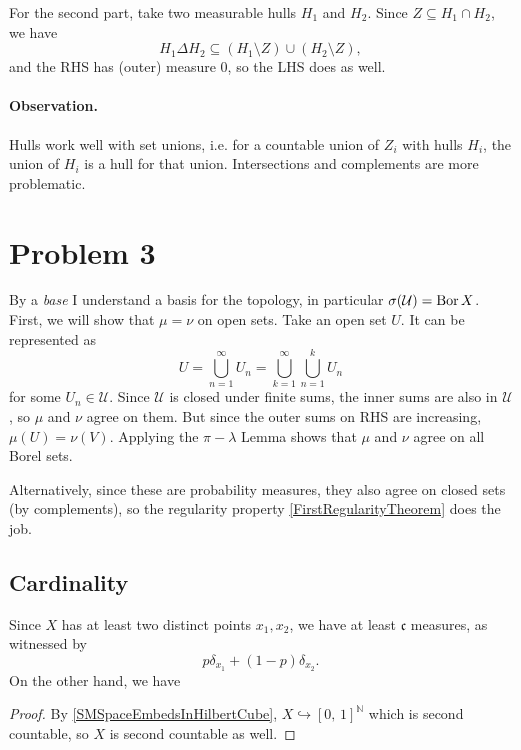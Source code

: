 For the second part, take two measurable hulls \( H_1 \) and \( H_2 \). Since \( Z \subseteq H_1 \cap H_2 \), we have
\[ 
    H_1 \Delta H_2 \subseteq (H_1 \setminus Z) \cup (H_2 \setminus Z),
\]
and the RHS has (outer) measure \( 0 \), so the LHS does as well.

\paragraph{Observation.} Hulls work well with set unions, i.e. for a countable union of \( Z_i \) with hulls \( H_i \), the union of \( H_i \) is a hull for that union. Intersections and complements are more problematic.

\section*{Problem 3}

By a \emph{base} I understand a basis for the topology, in particular \( \sigma( \mathcal{U} ) = \operatorname{Bor} X \). First, we will show that \( \mu = \nu \) on open sets. Take an open set \( U \). It can be represented as
\[ 
    U = \bigcup_{n=1}^\infty U_n = \bigcup_{k=1}^\infty \bigcup_{n=1}^k U_n
\]
for some \( U_n \in \mathcal{U} \). Since \( \mathcal{U} \) is closed under finite sums, the inner sums are also in \( \mathcal{U} \), so \( \mu \) and \( \nu \) agree on them. But since the outer sums on RHS are increasing, \( \mu(U) = \nu(V) \). Applying the \( \pi-\lambda \) Lemma shows that \( \mu \) and \( \nu \) agree on all Borel sets.

Alternatively, since these are probability measures, they also agree on closed sets (by complements), so the regularity property \ref{FirstRegularityTheorem} does the job.

\subsection*{Cardinality}

Since \( X \) has at least two distinct points \( x_1, x_2 \), we have at least \( \mathfrak{c} \) measures, as witnessed by
\[ 
    p\delta_{x_1} + (1-p)\delta_{x_2}. 
\]
On the other hand, we have

\begin{proof}
    By \ref{SMSpaceEmbedsInHilbertCube}, \( X \hookrightarrow [0,\,1]^{ \mathbb{N} } \) which is second countable, so \( X \) is second countable as well. 
\end{proof}

